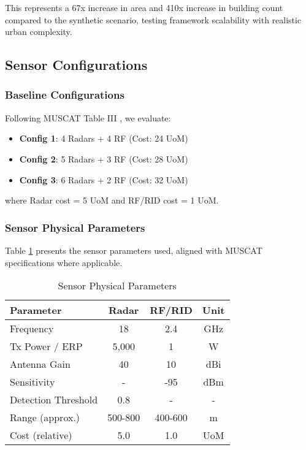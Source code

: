 This represents a 67x increase in area and 410x increase in building count compared to the synthetic scenario, testing framework scalability with realistic urban complexity.

\subsection{Sensor Configurations}

\subsubsection{Baseline Configurations}

Following MUSCAT Table III \cite{muscat2023}, we evaluate:

\begin{itemize}
\item \textbf{Config 1}: 4 Radars + 4 RF (Cost: 24 UoM)
\item \textbf{Config 2}: 5 Radars + 3 RF (Cost: 28 UoM)
\item \textbf{Config 3}: 6 Radars + 2 RF (Cost: 32 UoM)
\end{itemize}

where Radar cost = 5 UoM and RF/RID cost = 1 UoM.

\subsubsection{Sensor Physical Parameters}

Table \ref{tab:sensor_params} presents the sensor parameters used, aligned with MUSCAT specifications where applicable.

\begin{table}[h]
\centering
\caption{Sensor Physical Parameters}
\label{tab:sensor_params}
\begin{tabular}{lccc}
\toprule
\textbf{Parameter} & \textbf{Radar} & \textbf{RF/RID} & \textbf{Unit} \\
\midrule
Frequency & 18 & 2.4 & GHz \\
Tx Power / ERP & 5,000 & 1 & W \\
Antenna Gain & 40 & 10 & dBi \\
Sensitivity & - & -95 & dBm \\
Detection Threshold & 0.8 & - & - \\
Range (approx.) & 500-800 & 400-600 & m \\
Cost (relative) & 5.0 & 1.0 & UoM \\
\bottomrule
\end{tabular}
\end{table}

